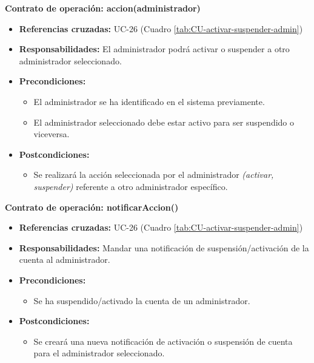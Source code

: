 \textbf{Contrato de operación: accion(administrador)}
\begin{itemize}
\item \textbf{Referencias cruzadas:} UC-26 (Cuadro \ref{tab:CU-activar-suspender-admin})
\item \textbf{Responsabilidades:} El administrador podrá activar o suspender a otro administrador seleccionado.
\item \textbf{Precondiciones:} 
 \begin{itemize}
\item El administrador se ha identificado en el sistema previamente.
\item El administrador seleccionado debe estar activo para ser suspendido o viceversa.
\end {itemize}
\item \textbf{Postcondiciones:} 
 \begin{itemize}
\item Se realizará la acción seleccionada por el administrador \textit{(activar, suspender)} referente a otro administrador específico.
\end {itemize}
\end {itemize}

\textbf{Contrato de operación: notificarAccion()}
\begin{itemize}
\item \textbf{Referencias cruzadas:} UC-26 (Cuadro \ref{tab:CU-activar-suspender-admin})
\item \textbf{Responsabilidades:} Mandar una notificación de suspensión/activación de la cuenta al administrador.
\item \textbf{Precondiciones:} 
 \begin{itemize}
\item Se ha suspendido/activado la cuenta de un administrador.
\end {itemize}
\item \textbf{Postcondiciones:} 
 \begin{itemize}
\item Se creará una nueva notificación de activación o suspensión de cuenta para el administrador seleccionado.
\end {itemize}
\end {itemize}

